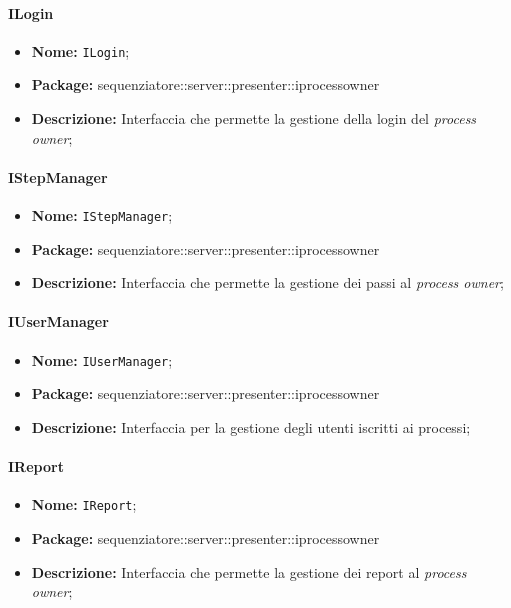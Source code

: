 \paragraph{ILogin}
	\begin{itemize}
		\item \textbf{Nome:} \texttt{ILogin};
		\item \textbf{Package:} sequenziatore::server::presenter::iprocessowner
		\item \textbf{Descrizione:} Interfaccia che permette la gestione della login del \textit{process owner};
	\end{itemize}

\paragraph{IStepManager}
	\begin{itemize}
		\item \textbf{Nome:} \texttt{IStepManager};
		\item \textbf{Package:} sequenziatore::server::presenter::iprocessowner
		\item \textbf{Descrizione:} Interfaccia che permette la gestione dei passi al \textit{process owner};
	\end{itemize}

\paragraph{IUserManager}
	\begin{itemize}
		\item \textbf{Nome:} \texttt{IUserManager};
		\item \textbf{Package:} sequenziatore::server::presenter::iprocessowner
		\item \textbf{Descrizione:} Interfaccia per la gestione degli utenti iscritti ai processi;
	\end{itemize}

\paragraph{IReport}
	\begin{itemize}
		\item \textbf{Nome:} \texttt{IReport};
		\item \textbf{Package:} sequenziatore::server::presenter::iprocessowner
		\item \textbf{Descrizione:} Interfaccia che permette la gestione dei report al \textit{process owner};
	\end{itemize}
